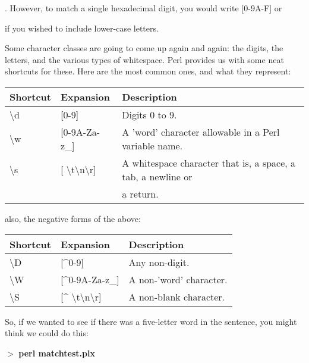 \documentclass[a4paper,11pt]{book}
\begin{document}
\noindent [0-9][A-F]. However, to match a single hexadecimal digit, you would write [0-9A-F] or

\noindent [0-9A-Fa-f] if you wished to include lower-case letters.

\noindent 

\noindent Some character classes are going to come up again and again: the digits, the letters, and the various types of whitespace. Perl provides us with some neat shortcuts for these.  Here are the most common ones, and what they represent:

\noindent 

\begin{tabular}{|p{0.7in}|p{0.9in}|p{2.5in}|} \hline 
\textbf{Shortcut} & \textbf{Expansion} & \textbf{Description} \\ \hline 
\textbackslash d & [0-9] & Digits 0 to 9. \\ \hline 
\textbackslash w & [0-9A-Za-z\_] & A 'word' character allowable in a Perl variable name. \\ \hline 
\textbackslash s & [ \textbackslash t\textbackslash n\textbackslash r] & A whitespace character that is, a space, a tab, a newline or \\ \hline 
 &  & a return. \\ \hline 
\end{tabular}



\noindent also, the negative forms of the above:

\noindent 

\begin{tabular}{|p{0.7in}|p{0.9in}|p{2.4in}|} \hline 
\textbf{Shortcut} & \textbf{Expansion} & \textbf{Description} \\ \hline 
\textbackslash D & [\^{}0-9] & Any non-digit. \\ \hline 
\textbackslash W & [\^{}0-9A-Za-z\_] & A non-'word' character. \\ \hline 
\textbackslash S & [\^{} \textbackslash t\textbackslash n\textbackslash r] & A non-blank character. \\ \hline 
\end{tabular}



\noindent 

\noindent So, if we wanted to see if there was a five-letter word in the sentence, you might think we could do this:

\noindent 

\noindent $>$ \textbf{perl matchtest.plx}
\end{document}
